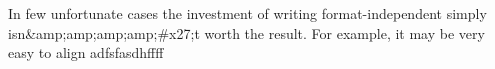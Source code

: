 
In few unfortunate cases the investment of writing format-independent \latex simply isn&amp;amp;amp;amp;#x27;t worth the result. For example, it may be very easy to align adfsfasdhffff